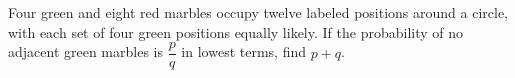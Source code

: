 Four green and eight red marbles occupy twelve labeled positions around a circle, with each set of four green positions equally likely. If the probability of no adjacent green marbles is $\dfrac{p}{q}$ in lowest terms, find $p+q$.
